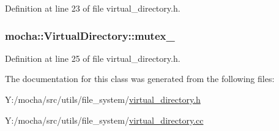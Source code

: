 Definition at line 23 of file virtual\_\-directory.h.

\hypertarget{classmocha_1_1_virtual_directory_a9492b47fe38abea4be3cd74cd81148fb}{
\subsubsection[{mutex\_\-}]{ {\bf mocha::VirtualDirectory::mutex\_\-}}}
\label{classmocha_1_1_virtual_directory_a9492b47fe38abea4be3cd74cd81148fb}


Definition at line 25 of file virtual\_\-directory.h.



The documentation for this class was generated from the following files:\begin{DoxyCompactItemize}
\item 
Y:/mocha/src/utils/file\_\-system/\hyperlink{virtual__directory_8h}{virtual\_\-directory.h}\item 
Y:/mocha/src/utils/file\_\-system/\hyperlink{virtual__directory_8cc}{virtual\_\-directory.cc}\end{DoxyCompactItemize}

